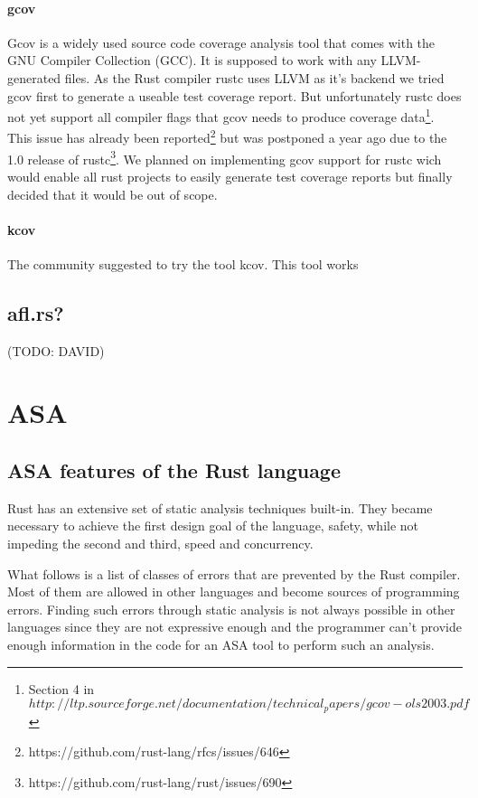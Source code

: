 \documentclass{scrartcl}
\newcommand{\todo}[1] {{\color{red}(TODO: #1)}}
\begin{document}
\paragraph{gcov}
Gcov is a widely used source code coverage analysis tool that comes with the GNU Compiler Collection (GCC). It is supposed to work with any LLVM-generated files. As the Rust compiler rustc uses LLVM as it's backend we tried gcov first to generate a useable test coverage report. But unfortunately rustc does not yet support all compiler flags that gcov needs to produce coverage data\footnote{Section 4 in $http://ltp.sourceforge.net/documentation/technical_papers/gcov-ols2003.pdf$}. This issue has already been reported\footnote{https://github.com/rust-lang/rfcs/issues/646} but was postponed a year ago due to the 1.0 release of rustc\footnote{https://github.com/rust-lang/rust/issues/690}. We planned on implementing gcov support for rustc wich would enable all rust projects to easily generate test coverage reports but finally decided that it would be out of scope.

\paragraph{kcov}
The community suggested to try the tool kcov. This tool works 

\subsection{afl.rs?}
\todo{DAVID}





\section{ASA}



\subsection{ASA features of the Rust language} \label{rust_features}

Rust has an extensive set of static analysis techniques built-in. They became necessary to achieve the first design goal of the language, safety, while not impeding the second and third, speed and concurrency.

What follows is a list of classes of errors that are prevented by the Rust compiler. Most of them are allowed in other languages and become sources of programming errors. Finding such errors through static analysis is not always possible in other languages since they are not expressive enough and the programmer can't provide enough information in the code for an ASA tool to perform such an analysis.
\end{document}
